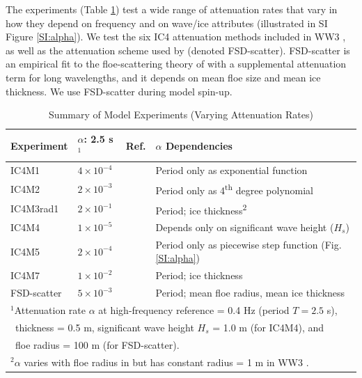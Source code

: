 \documentclass [11pt, proquest] {uwthesis}[2020/02/24]
\begin{document}
The experiments (Table \ref{tab:experiments}) test a wide range of attenuation rates that vary in how they depend on frequency and on wave/ice attributes (illustrated in SI Figure \ref{SI:alpha}). We test the six IC4 attenuation methods included in WW3 \cite{TheWAVEWATCHIIIRDevelopmentGroupWW3DG2016User5.16, Collins2017ANRL/MR/7320179726}, as well as the attenuation scheme used by \cite{Roach2019} (denoted FSD-scatter). FSD-scatter is an empirical fit to the floe-scattering theory of \cite{Meylan2021AFloes} with a supplemental attenuation term for long wavelengths, and it depends on mean floe size and mean ice thickness. We use FSD-scatter during model spin-up.  

\begin{table}[!h]
\caption{Summary of Model Experiments (Varying Attenuation Rates)}
\centering
\begin{tabular}{l l l l}
  \hline
  Experiment    & $\alpha$: 2.5 s$^1$  & Ref.   & $\alpha$ Dependencies \\
  \hline
  IC4M1      & $4 \times 10^{-4}$      & \cite{Wadhams1988TheZone} & Period only as exponential function \\
  IC4M2      & $2 \times 10^{-3}$      & \cite{Meylan2014InZone}     & Period only as 4\textsuperscript{th} degree polynomial\\
  IC4M3rad1  & $2 \times 10^{-1}$      & \cite{Horvat2015, Kohout2008AnZone} & Period; ice thickness\textsuperscript{2}\\
  IC4M4      & $1 \times 10^{-5}$      & \cite{Kohout2014Storm-inducedExtent} & Depends only on significant wave height ($H_s$) \\
  IC4M5      & $2 \times 10^{-4}$      & \cite{Collins2017ANRL/MR/7320179726}  & Period only as piecewise step function (Fig. \ref{SI:alpha})\\
  IC4M7      & $1 \times 10^{-2}$      & \cite{Doble2015RelatingResults}   & Period; ice thickness \\
  FSD-scatter      & $5 \times 10^{-3}$   & \cite{Meylan2021AFloes}   & Period; mean floe radius, mean ice thickness \\
  \hline 
  \multicolumn{4}{l}{$^1$Attenuation rate $\alpha$ at high-frequency reference = 0.4 Hz (period $T = 2.5$ s),}\\
  \multicolumn{4}{l}{\ thickness = 0.5 m, significant wave height $H_s$ = 1.0 m (for IC4M4), and}\\
  \multicolumn{4}{l}{\ floe radius = 100 m (for FSD-scatter).}\\
  \multicolumn{4}{l}{$^2 \alpha$ varies with floe radius in \cite{Horvat2015} but has constant radius = 1 m in WW3 \cite{Rogers2021IncorporatingIce}.}\\
  
\end{tabular}
\label{tab:experiments}
\end{table} 
\end{document}
